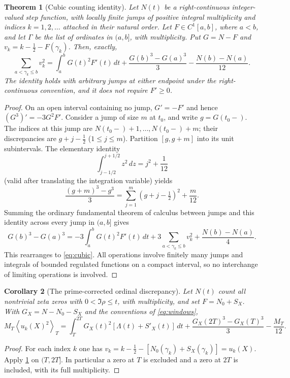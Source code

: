 \documentclass[11pt,reqno]{amsart}
\numberwithin{equation}{section}
\newtheorem{theorem}{Theorem}[section]
\newtheorem{corollary}[theorem]{Corollary}
\newcommand{\av}[1]{\left\langle #1\right\rangle_T}
\begin{document}
\begin{theorem}[Cubic counting identity]\label{thm:cubic}
Let $N(t)$ be a right-continuous integer-valued step function, with
locally finite jumps of positive integral multiplicity and indices
$k=1,2,\ldots$ attached in their natural order.  Let $F\in C^1[a,b]$,
where $a<b$, and let $\Gamma$ be the list of ordinates in $(a,b]$,
with multiplicity.  Put $G=N-F$ and $v_k=k-\tfrac12-F(\gamma_k)$.
Then, exactly,
\begin{equation}\label{eq:cubic}
\sum_{a<\gamma_k\le b}v_k^2
 =\int_a^b G(t)^2F'(t)\,dt
 +\frac{G(b)^3-G(a)^3}{3}-\frac{N(b)-N(a)}{12}.
\end{equation}
The identity holds with arbitrary jumps at either endpoint under the
right-continuous convention, and it does not require $F'\ge0$.
\end{theorem}
\begin{proof}
On an open interval containing no jump, $G'=-F'$ and hence
$(G^3)'=-3G^2F'$.  Consider a jump of size $m$ at $t_0$, and write
$g=G(t_0-)$.  The indices at this jump are
$N(t_0-)+1,\dots,N(t_0-)+m$; their discrepancies are
$g+j-\tfrac12$ ($1\le j\le m$).  Partition $[g,g+m]$ into its
unit subintervals.  The elementary identity
\[
\int_{j-1/2}^{j+1/2}z^2\,dz=j^2+\frac1{12}
\]
(valid after translating the integration variable) yields
\[
\frac{(g+m)^3-g^3}{3}
 =\sum_{j=1}^m(g+j-\tfrac12)^2+\frac{m}{12}.
\]
Summing the ordinary fundamental theorem of calculus between jumps
and this identity across every jump in $(a,b]$ gives
\[
G(b)^3-G(a)^3=-3\int_a^bG(t)^2F'(t)\,dt
 +3\sum_{a<\gamma_k\le b}v_k^2+\frac{N(b)-N(a)}4.
\]
This rearranges to \eqref{eq:cubic}.  All operations involve finitely
many jumps and integrals of bounded regulated functions on a compact
interval, so no interchange of limiting operations is involved.
\end{proof}

\begin{corollary}[The prime-corrected ordinal discrepancy]\label{cor:cubicprime}
Let $N(t)$ count all nontrivial zeta zeros with $0<\Im\rho\le t$,
with multiplicity, and set $F=N_0+S_X$.  With
$G_X=N-N_0-S_X$ and the conventions of \eqref{eq:windows},
\begin{equation}\label{eq:exactdefect}
M_T\av{u_k(X)^2}
 =\int_T^{2T}G_X(t)^2[\Lambda(t)+S'_X(t)]\,dt
 +\frac{G_X(2T)^3-G_X(T)^3}{3}-\frac{M_T}{12}.
\end{equation}
\end{corollary}
\begin{proof}
For each index $k$ one has
$v_k=k-\tfrac12-[N_0(\gamma_k)+S_X(\gamma_k)]=u_k(X)$.
Apply \cref{thm:cubic} on $(T,2T]$.  In particular a zero at $T$
is excluded and a zero at $2T$ is included, with its full multiplicity.
\end{proof}
\end{document}
